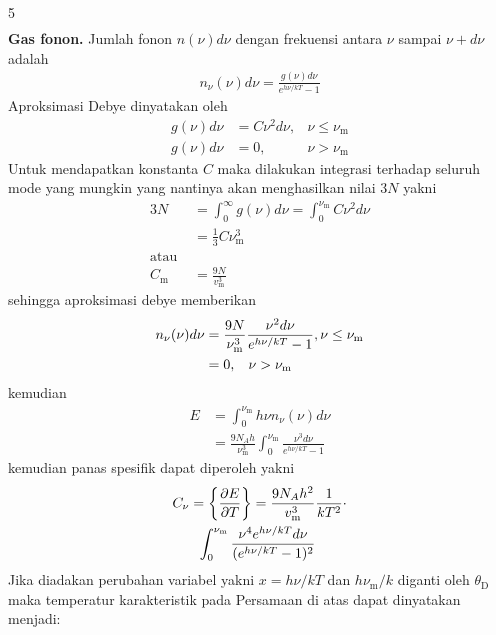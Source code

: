 \documentclass[a4paper  , 6 pt]{article}
\begin{document}
\begin{tiny}
\begin{multicols} {5}
\begin{align}
 \end{align}
 \newline
\textbf{Gas fonon.} \newline
Jumlah fonon $n(\nu) d\nu$ dengan frekuensi antara $\nu$ sampai $\nu + d \nu$ adalah
\begin{align}
n_\nu(\nu) d\nu = \frac{g(\nu) d\nu}{e^{h\nu /kT} - 1} \tag{13}
\end{align}
Aproksimasi Debye dinyatakan oleh
\begin{align}
g(\nu) d\nu &  = C \nu^2 d \nu , & \nu \le \nu_\mathrm{m} \nonumber \\
g(\nu) d\nu & = 0, & \nu > \nu_\mathrm{m} \nonumber 
\end{align}
Untuk mendapatkan konstanta $C$ maka dilakukan  integrasi terhadap seluruh mode yang mungkin yang nantinya akan menghasilkan nilai $3N$ yakni
\begin{align}
3N & = \int_{0}^{\infty} g(\nu)  d\nu  = \int_{0}^{\nu_\mathrm{m}} C \nu^2  d\nu  \nonumber \\
& = \frac{1}{3} C \nu_\mathrm{m}^3 \nonumber \\
\text{atau }& \nonumber \\
C_\mathrm{m}& = \frac{9N}{v_\mathrm{m}^3} \nonumber
 \end{align}
 sehingga aproksimasi debye memberikan
 \begin{align}
 n_\nu (\nu) d\nu& = \frac{9N}{\nu_\mathrm{m}^3} \frac{\nu^2 d\nu}{e^{h\nu /kT} -  1} ,  \nu \le \nu_\mathrm{m} \nonumber \\
  & = 0,\hspace{0.3 cm}  \nu > \nu_\mathrm{m} \nonumber
 \end{align}
 kemudian 
 \begin{align}
 E & = \int_{0}^{\nu_\mathrm{m}}  h \nu n_\nu (\nu) d\nu  \nonumber \\
 & = \frac{9 N_A h}{\nu_\mathrm{m}^3} \int_{0}^{\nu_\mathrm{m}} \frac{\nu^3 d\nu}{e^{h\nu /kT} - 1} \nonumber
 \end{align}
 kemudian panas spesifik dapat diperoleh yakni
  \begin{align}
  C_\nu & = \left\lbrace \frac{\partial E}{\partial T} \right\rbrace   = \frac{9 N_A h^2}{v_\mathrm{m}^3} \frac{1}{kT^2} \cdot \nonumber \\ 
   & \hspace{0.2 cm }\int_{0}^{\nu_\mathrm{m}} \frac{\nu^4e^{h\nu /kT} d\nu }{(e^{h\nu /kT} - 1)^2} 
 \end{align}
 Jika diadakan perubahan variabel yakni $x = h\nu /kT$ dan $h\nu_\mathrm{m}/k $ diganti oleh $\theta_\mathrm{D}$ maka temperatur karakteristik pada Persamaan di atas dapat dinyatakan menjadi:

\end{multicols}
\end{tiny}
\end{document}
